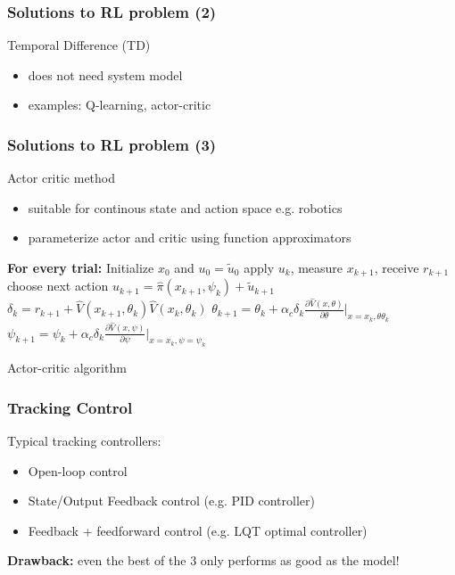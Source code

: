 \documentclass{beamer}
\begin{document}
	\begin{frame}\frametitle{Solutions to RL problem (2)}
		\vspace{3mm}
		\fontsize{8}{4}\selectfont 
		Temporal Difference (TD)
		\begin{itemize}
			\item does not need system model
			\item examples: Q-learning, actor-critic 
		\end{itemize}	
	\end{frame}
			
	\begin{frame}\frametitle{Solutions to RL problem (3)}
		\vspace{3mm}
		\fontsize{8}{4}\selectfont
		Actor critic method
		\begin{itemize}		 	
			\item suitable for continous state and action space e.g. robotics
			\item parameterize actor and critic using function approximators
		\end{itemize}
		\begin{algorithm}[H]
			\begin{algorithmic}[1]    			
				\fontsize{8}{4}\selectfont 
				\STATE \textbf{For every trial:}
				\STATE  Initialize $x_0$ and $u_0 = \tilde{u}_0$
				\REPEAT
				\STATE apply $u_k$, measure $x_{k+1}$, receive $r_{k+1}$ 
				\STATE choose next action $ u_{k+1} = \hat{\pi}(x_{k+1}, \psi_k) + \tilde{u}_{k+1} $ 
				\STATE $ \delta_k = r_{k+1} + \hat{V}(x_{k+1}, \theta_k) \hat{V}(x_{k}, \theta_k) $ 
				\STATE $ \theta_{k+1} = \theta_k + \alpha_c\delta_k \frac{\partial \hat{V}(x,\theta)}{\partial \theta} \bigg|_{x=x_k, \theta \theta_k}$ 
				\STATE $ \psi_{k+1} = \psi_k + \alpha_c\delta_k \frac{\partial \hat{V}(x,\psi)}{\partial \psi} \bigg|_{x=x_k, \psi = \psi_k}$
			\end{algorithmic}
			\caption{Actor-critic algorithm}
		\end{algorithm}
	\end{frame}	
				
	\begin{frame}\frametitle{Tracking Control}
		Typical tracking controllers:
		\begin{itemize}
			\item Open-loop control 
			\item State/Output Feedback control (e.g. PID controller)
			\item Feedback + feedforward control (e.g. LQT optimal controller)
		\end{itemize}
		\vspace{3mm}
		\textbf{Drawback:} even the best of the 3 only performs as good as the model!
	\end{frame}
	
\end{document}
